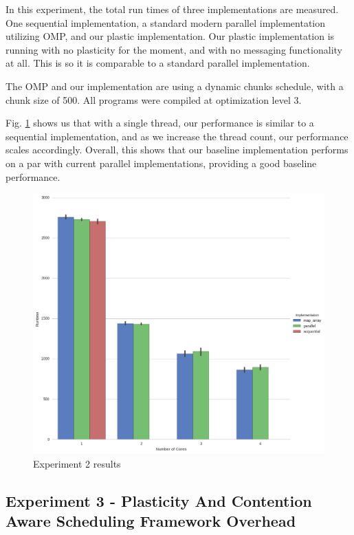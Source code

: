 In this experiment, the total run times of three implementations are measured. One sequential implementation, a standard modern parallel implementation utilizing OMP, and our plastic implementation. Our plastic implementation is running with no plasticity for the moment, and with no messaging functionality at all. This is so it is comparable to a standard parallel implementation.

The OMP and our implementation are using a dynamic chunks schedule, with a chunk size of 500. All programs were compiled at optimization level 3.

Fig. \ref{fig:results_ex2} shows us that with a single thread, our performance is similar to a sequential implementation, and as we increase the thread count, our performance scales accordingly. Overall, this shows that our baseline implementation performs on a par with current parallel implementations, providing a good baseline performance. 

\begin{figure}
	\centering
	\includegraphics[width=\textwidth]{graphics/experiment2.png}
	\caption{Experiment 2 results}
	\label{fig:results_ex2}
\end{figure}





\subsection{Experiment 3 - Plasticity And Contention Aware Scheduling Framework Overhead}



